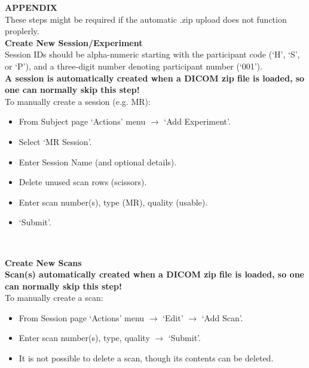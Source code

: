 \documentclass[a4paper,11pt,oneside]{book}
\newcommand\headingshack{
\noindent
\large
\leftskip=0in
\textbf
}
\newcommand\titlesL{%
    \noindent
    \small
    \leftskip=0in
    \textbf
}
\newcommand\titlesR{%
    \noindent
    \small
    \leftskip=0.15in
    \textbf
}
\newcommand\stepsL{
    \noindent
    \leftskip=0.15in
    \small
}
\newcommand\stepsR{
    \noindent
    \leftskip=0.3in
    \small
}
\begin{document}
\begin{multicols}{2}
{%
\columnbreak

\headingshack{APPENDIX}\\

\stepsL{These steps might be required if the automatic .zip upload does not function proplerly.} \\


\titlesL{Create New Session/Experiment} \\

\stepsL{Session IDs should be alpha-numeric starting with the participant code (`H', `S', or `P'), and a three-digit number denoting participant number (`001').} \\

\stepsL{\textbf{A session is automatically created when a DICOM zip file is loaded, so one can normally skip this step!}} \\

\stepsR{To manually create a session (e.g. MR):}

\stepsR{\begin{itemize}
            \item{From Subject page `Actions' menu $\rightarrow$ `Add Experiment'.}
            \item{Select `MR Session'.}
            \item{Enter Session Name (and optional details).}
            \item{Delete unused scan rows (scissors).}
            \item{Enter scan number(s), type (MR), quality (usable).}
            \item{`Submit'.}
            \end{itemize}
        } \


\titlesR{Create New Scans} \\

\stepsR{\textbf{Scan(s) automatically created when a DICOM zip file is loaded, so one can normally skip this step!}} \\

\stepsR{To manually create a scan:}
\stepsR{\begin{itemize}    
            \item{From Session page `Actions' menu $\rightarrow$ `Edit' $\rightarrow$ `Add Scan'.}
            \item{Enter scan number(s), type, quality $\rightarrow$ `Submit'.}
            \item{It is not possible to delete a scan, though its contents can be deleted.}
        \end{itemize}
        } \

}
\end{multicols}
\end{document}
